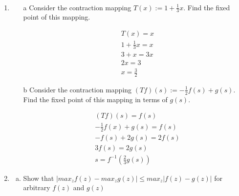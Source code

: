 \documentclass{exam}
\begin{document}

\begin{problem}
\ \newline

\begin{enumerate}
    \item 
    
    \begin{enumerate}
        \item [a]  Consider the contraction mapping $T(x) := 1 + \frac{1}{3} x$. Find the fixed point of this mapping.
            \begin{solutionorlines}[2in] 
                \begin{align*}
                    &T(x) = x \\
                    &1 + \frac{1}{3}x = x \\
                    &3 + x = 3x \\
                    & 2x = 3 \\
                    &x = \frac{3}{2}
                \end{align*}
            \end{solutionorlines}
        \item [b] Consider the contraction mapping $(Tf)(s) := -\frac{1}{2}f(s) + g(s)$. Find the fixed point of this mapping in terms of $g(s)$.
            \begin{solutionorlines}[2in]
                \begin{align*}
                    &(Tf)(s) = f(s) \\
                    & -\frac{1}{2} f(x) + g(s) = f(s) \\
                    &-f(s) + 2g(s) = 2f(s) \\
                    &3f(s) = 2g(s) \\
                    & s = f^{-1}(\frac{2}{3}g(s))
                \end{align*}
            \end{solutionorlines}


    \end{enumerate}

    \item
    \begin{enumerate}[(a)]
        \item Show that $|max_z f(z) - max_z g(z)| \le max_z |f(z) - g(z)| $ for arbitrary $f(z)$
 and $g(z)$
        \begin{solutionorlines}[2in] 
            

\end{solutionorlines}
\end{enumerate}
\end{enumerate}
\end{problem}
\end{document}
